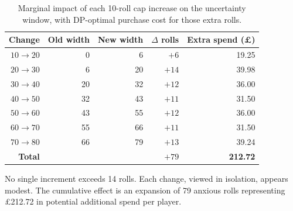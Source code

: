 \documentclass[11pt, a4paper]{article}
\begin{document}
\begin{table}[H]
\centering
\caption{Marginal impact of each 10-roll cap increase on the
uncertainty window, with DP-optimal purchase cost for those extra rolls.}
\label{tab:marginal}
\begin{tabular}{r r r r r}
\toprule
Change & Old width & New width & $\Delta$ rolls &
Extra spend (\pounds) \\
\midrule
$10 \to 20$ & 0  & 6  & $+6$  & 19.25 \\
$20 \to 30$ & 6  & 20 & $+14$ & 39.98 \\
$30 \to 40$ & 20 & 32 & $+12$ & 36.00 \\
$40 \to 50$ & 32 & 43 & $+11$ & 31.50 \\
$50 \to 60$ & 43 & 55 & $+12$ & 36.00 \\
$60 \to 70$ & 55 & 66 & $+11$ & 31.50 \\
$70 \to 80$ & 66 & 79 & $+13$ & 39.24 \\
\midrule
\textbf{Total} & & & \textbf{$+79$} &
\textbf{212.72} \\
\bottomrule
\end{tabular}
\end{table}

\noindent No single increment exceeds 14 rolls. Each change, viewed
in isolation, appears modest. The cumulative effect is an expansion
of 79 anxious rolls representing \pounds212.72 in potential additional
spend per player.


\end{document}

